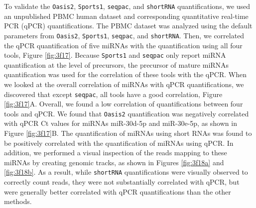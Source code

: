\documentclass[12pt,twoside]{reedthesis}
\begin{document}
To validate the \texttt{Oasis2}, \texttt{Sports1}, \texttt{seqpac}, and \texttt{shortRNA}
quantifications, we used an unpublished PBMC human dataset and
corresponding quantitative real-time PCR (qPCR) quantifications. The
PBMC dataset was analyzed using the default parameters from \texttt{Oasis2},
\texttt{Sports1}, \texttt{seqpac}, and \texttt{shortRNA}. Then, we correlated the qPCR
quantification of five miRNAs with the quantification using all four
tools, Figure \ref{fig:3f17}. Because \texttt{Sports1} and \texttt{seqpac} only report
miRNA quantification at the level of precursors, the precursor of mature
miRNAs quantification was used for the correlation of these tools with
the qPCR. When we looked at the overall correlation of miRNAs with qPCR
quantifications, we discovered that except \texttt{seqpac}, all tools have a
good correlation, Figure \ref{fig:3f17}A. Overall, we found a low
correlation of quantifications between four tools and qPCR. We found
that \texttt{Oasis2} quantification was negatively correlated with qPCR Ct
values for miRNAs miR-30d-5p and miR-30e-5p, as shown in Figure
\ref{fig:3f17}B. The quantification of miRNAs using short RNAs was found
to be positively correlated with the quantification of miRNAs using
qPCR. In addition, we performed a visual inspection of the reads mapping
to these miRNAs by creating genomic tracks, as shown in Figures
\ref{fig:3f18a} and \ref{fig:3f18b}. As a result, while \texttt{shortRNA}
quantifications were visually observed to correctly count reads, they
were not substantially correlated with qPCR, but were generally better
correlated with qPCR quantifications than the other methods.
\end{document}
